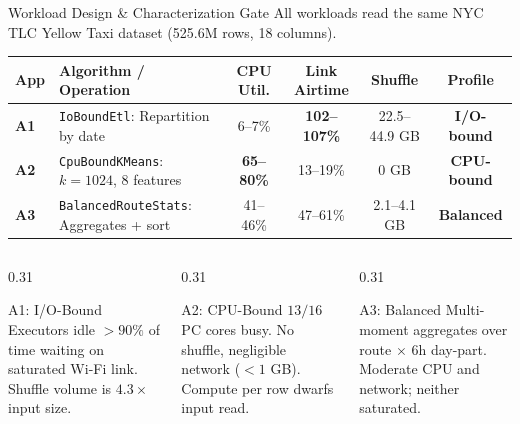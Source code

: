 \documentclass[aspectratio=169, 10pt]{beamer}
\begin{document}
\begin{frame}{Workload Design \& Characterization Gate}
  \small
  All workloads read the same NYC TLC Yellow Taxi dataset (525.6M rows, 18 columns).
  \vspace{0.15cm}

  \begin{table}
    \centering
    \footnotesize
    \begin{tabular}{llcccc}
      \toprule
      \textbf{App} & \textbf{Algorithm / Operation} & \textbf{CPU Util.} & \textbf{Link Airtime} & \textbf{Shuffle} & \textbf{Profile} \\
      \midrule
      \textbf{A1} & \texttt{IoBoundEtl}: Repartition by date & 6--7\% & \textbf{102--107\%} & 22.5--44.9 GB & \textbf{I/O-bound} \\
      \textbf{A2} & \texttt{CpuBoundKMeans}: $k=1024$, 8 features & \textbf{65--80\%} & 13--19\% & 0 GB & \textbf{CPU-bound} \\
      \textbf{A3} & \texttt{BalancedRouteStats}: Aggregates + sort & 41--46\% & 47--61\% & 2.1--4.1 GB & \textbf{Balanced} \\
      \bottomrule
    \end{tabular}
  \end{table}

  \begin{columns}[onlytextwidth]
    \begin{column}{0.31\textwidth}
      \begin{block}{\footnotesize A1: I/O-Bound}
        \scriptsize
        Executors idle $>90\%$ of time waiting on saturated Wi-Fi link. Shuffle volume is $4.3\times$ input size.
      \end{block}
    \end{column}
    \hfill
    \begin{column}{0.31\textwidth}
      \begin{block}{\footnotesize A2: CPU-Bound}
        \scriptsize
        $13/16$ PC cores busy. No shuffle, negligible network ($<1$ GB). Compute per row dwarfs input read.
      \end{block}
    \end{column}
    \hfill
    \begin{column}{0.31\textwidth}
      \begin{block}{\footnotesize A3: Balanced}
        \scriptsize
        Multi-moment aggregates over route $\times$ 6h day-part. Moderate CPU and network; neither saturated.
      \end{block}
    \end{column}
  \end{columns}
\end{frame}
\end{document}
